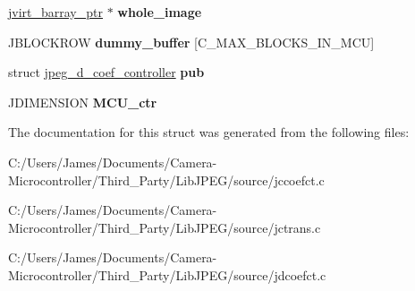 \begin{DoxyCompactItemize}
\item 
\mbox{\label{structmy__coef__controller_a7001898014de254c3043282bf8860b30}} 
\hyperlink{structjvirt__barray__control}{jvirt\+\_\+barray\+\_\+ptr} $\ast$ {\bfseries whole\+\_\+image}
\item 
\mbox{\label{structmy__coef__controller_a1652f7bd045fa0cfb5712c46e1febd9d}} 
J\+B\+L\+O\+C\+K\+R\+OW {\bfseries dummy\+\_\+buffer} \mbox{[}C\+\_\+\+M\+A\+X\+\_\+\+B\+L\+O\+C\+K\+S\+\_\+\+I\+N\+\_\+\+M\+CU\mbox{]}
\item 
\mbox{\label{structmy__coef__controller_af8f9d0ce8f00d0fa052531321a811603}} 
struct \hyperlink{structjpeg__d__coef__controller}{jpeg\+\_\+d\+\_\+coef\+\_\+controller} {\bfseries pub}
\item 
\mbox{\label{structmy__coef__controller_a0fea69c0d2e4ace7a7c396a076223d3a}} 
J\+D\+I\+M\+E\+N\+S\+I\+ON {\bfseries M\+C\+U\+\_\+ctr}
\end{DoxyCompactItemize}


The documentation for this struct was generated from the following files\+:\begin{DoxyCompactItemize}
\item 
C\+:/\+Users/\+James/\+Documents/\+Camera-\/\+Microcontroller/\+Third\+\_\+\+Party/\+Lib\+J\+P\+E\+G/source/jccoefct.\+c\item 
C\+:/\+Users/\+James/\+Documents/\+Camera-\/\+Microcontroller/\+Third\+\_\+\+Party/\+Lib\+J\+P\+E\+G/source/jctrans.\+c\item 
C\+:/\+Users/\+James/\+Documents/\+Camera-\/\+Microcontroller/\+Third\+\_\+\+Party/\+Lib\+J\+P\+E\+G/source/jdcoefct.\+c\end{DoxyCompactItemize}
